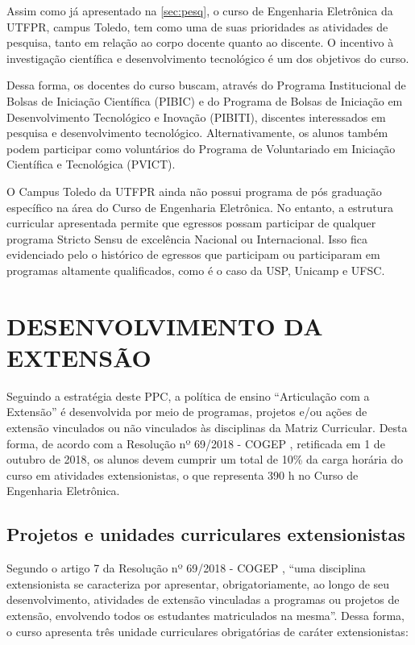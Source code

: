 Assim como já apresentado na \autoref{sec:pesq}, o curso de Engenharia Eletrônica da UTFPR, campus Toledo, tem como uma de suas prioridades as atividades de pesquisa, tanto em relação ao corpo docente quanto ao discente. O incentivo à investigação científica e desenvolvimento tecnológico é um dos objetivos do curso.

Dessa forma, os docentes do curso buscam, através do Programa Institucional de Bolsas de Iniciação Científica (PIBIC) e do Programa de Bolsas de Iniciação em Desenvolvimento Tecnológico e Inovação (PIBITI), discentes interessados em pesquisa e desenvolvimento tecnológico. Alternativamente, os alunos também podem participar como voluntários do Programa de Voluntariado em Iniciação Científica e Tecnológica (PVICT).

O Campus Toledo da UTFPR ainda não possui programa de pós graduação específico na área do Curso de Engenharia Eletrônica. No entanto, a estrutura curricular apresentada permite que egressos possam participar de qualquer programa Stricto Sensu de excelência Nacional ou Internacional. Isso fica evidenciado pelo o histórico de egressos que participam ou participaram em programas altamente qualificados, como é o caso da USP, Unicamp e UFSC.

\section{DESENVOLVIMENTO DA EXTENSÃO}

Seguindo a estratégia deste PPC, a política de ensino ``Articulação com a Extensão'' é desenvolvida por meio de programas, projetos e/ou ações de extensão vinculados ou não vinculados às disciplinas da Matriz Curricular. Desta forma, de acordo com a Resolução nº 69/2018 - COGEP \cite{cogep69}, retificada em 1\textordmasculine{} de outubro de 2018, os alunos devem cumprir um total de 10\% da carga horária do curso em atividades extensionistas, o que representa 390 h no Curso de Engenharia Eletrônica.

\subsection{Projetos e unidades curriculares extensionistas}

Segundo o artigo 7\textordmasculine{} da Resolução nº 69/2018 - COGEP \cite{cogep69}, ``uma disciplina extensionista se caracteriza por apresentar, obrigatoriamente, ao longo de seu desenvolvimento, atividades de extensão vinculadas a programas ou projetos de extensão, envolvendo todos os estudantes matriculados na mesma''. Dessa forma, o curso apresenta três unidade curriculares obrigatórias de caráter extensionistas:

